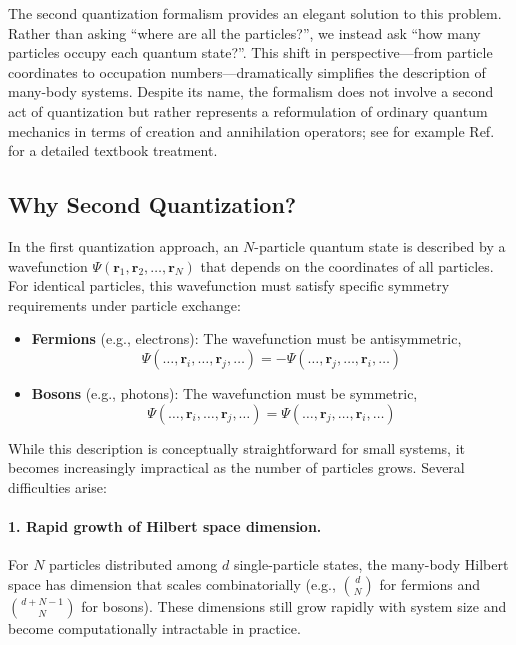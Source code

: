 \documentclass[12pt,oneside,openright]{report}
\theoremstyle{definition}
\theoremstyle{plain}
\theoremstyle{remark}
\begin{document}
The second quantization formalism provides an elegant solution to this problem. Rather than asking ``where are all the particles?'', we instead ask ``how many particles occupy each quantum state?''. This shift in perspective—from particle coordinates to occupation numbers—dramatically simplifies the description of many-body systems. Despite its name, the formalism does not involve a second act of quantization but rather represents a reformulation of ordinary quantum mechanics in terms of creation and annihilation operators; see for example Ref.~\cite{AltlandSimons} for a detailed textbook treatment.

\subsection{Why Second Quantization?}
\label{subsec:why_second_quant}
In the first quantization approach, an $N$-particle quantum state is described by a wavefunction 
$\Psi(\mathbf{r}_1, \mathbf{r}_2, \ldots, \mathbf{r}_N)$ that depends on the coordinates of all particles. 
For identical particles, this wavefunction must satisfy specific symmetry requirements under particle exchange:
\begin{itemize}
\item \textbf{Fermions} (e.g., electrons): The wavefunction must be antisymmetric, 
$$\Psi(\ldots, \mathbf{r}_i, \ldots, \mathbf{r}_j, \ldots) = -\Psi(\ldots, \mathbf{r}_j, \ldots, \mathbf{r}_i, \ldots)$$
\item \textbf{Bosons} (e.g., photons): The wavefunction must be symmetric,
$$\Psi(\ldots, \mathbf{r}_i, \ldots, \mathbf{r}_j, \ldots) = \Psi(\ldots, \mathbf{r}_j, \ldots, \mathbf{r}_i, \ldots)$$
\end{itemize}

While this description is conceptually straightforward for small systems, it becomes increasingly 
impractical as the number of particles grows. Several difficulties arise:

\paragraph{1. Rapid growth of Hilbert space dimension.}
For $N$ particles distributed among $d$ single-particle states, the many-body Hilbert space has 
dimension that scales combinatorially (e.g., $\binom{d}{N}$ for fermions and $\binom{d+N-1}{N}$ for bosons).
These dimensions still grow rapidly with system size and become computationally intractable in practice.
\end{document}

